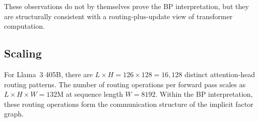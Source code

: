 These observations do not by themselves prove the BP interpretation, but
they are structurally consistent with a routing-plus-update view of
transformer computation.

\subsection*{Scaling}

For Llama~3 405B, there are $L \times H = 126 \times 128 = 16{,}128$
distinct attention-head routing patterns. The number of routing
operations per forward pass scales as
$L \times H \times W = 132\mathrm{M}$ at sequence length
$W = 8192$. Within the BP interpretation, these routing operations form
the communication structure of the implicit factor graph.